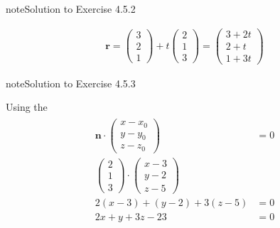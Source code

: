 \documentclass[letterpaper,10pt,english]{jupyterBook}
\begin{document}
\begin{sphinxadmonition}{note}{Solution to Exercise 4.5.2}


\begin{equation*}
\begin{split} \mathbf{r} = \begin{pmatrix} 3 \\ 2 \\ 1 \end{pmatrix} + t \begin{pmatrix} 2 \\ 1 \\ 3 \end{pmatrix}  = \begin{pmatrix} 3 + 2 t \\ 2 + t \\ 1 + 3 t \end{pmatrix} \end{split}
\end{equation*}\end{sphinxadmonition}
 \label{_pages/A4_Coordinate_geometry_exercises_solutions:_pages/A4_Coordinate_geometry_exercises_solutions-solution-2}

\begin{sphinxadmonition}{note}{Solution to Exercise 4.5.3}



\sphinxAtStartPar
Using the {\hyperref[\detokenize{_pages/4.2_Planes:point-normal-definition}]{}}
\begin{equation*}
\begin{split} \begin{align*}
    \mathbf{n} \cdot \begin{pmatrix} x - x_0 \\ y - y_0 \\ z - z_0 \end{pmatrix} &= 0 \\
    \begin{pmatrix} 2 \\ 1 \\ 3 \end{pmatrix} \cdot
    \begin{pmatrix} x - 3 \\ y - 2 \\ z - 5 \end{pmatrix} \\
    2(x - 3) + (y - 2) + 3(z - 5) &= 0 \\
    2 x + y + 3 z - 23 &= 0
\end{align*} \end{split}
\end{equation*}\end{sphinxadmonition}
 \label{_pages/A4_Coordinate_geometry_exercises_solutions:_pages/A4_Coordinate_geometry_exercises_solutions-solution-3}
\end{document}
